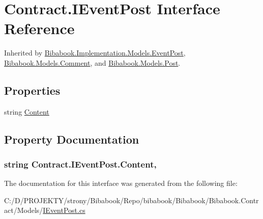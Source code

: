 \hypertarget{interface_contract_1_1_i_event_post}{}\section{Contract.\+I\+Event\+Post Interface Reference}
\label{interface_contract_1_1_i_event_post}


Inherited by \hyperlink{class_bibabook_1_1_implementation_1_1_models_1_1_event_post}{Bibabook.\+Implementation.\+Models.\+Event\+Post}, \hyperlink{class_bibabook_1_1_models_1_1_comment}{Bibabook.\+Models.\+Comment}, and \hyperlink{class_bibabook_1_1_models_1_1_post}{Bibabook.\+Models.\+Post}.

\subsection*{Properties}
\begin{DoxyCompactItemize}
\item 
string \hyperlink{interface_contract_1_1_i_event_post_a6ccae8749a3456fb835972d81ea7e3ed}{Content}
\end{DoxyCompactItemize}


\subsection{Property Documentation}
\hypertarget{interface_contract_1_1_i_event_post_a6ccae8749a3456fb835972d81ea7e3ed}{}
\subsubsection[{Content}]{\setlength{\rightskip}{0pt plus 5cm}string Contract.\+I\+Event\+Post.\+Content\hspace{0.3cm}{\ttfamily [get]}, {\ttfamily [set]}}\label{interface_contract_1_1_i_event_post_a6ccae8749a3456fb835972d81ea7e3ed}


The documentation for this interface was generated from the following file\+:\begin{DoxyCompactItemize}
\item 
C\+:/\+D/\+P\+R\+O\+J\+E\+K\+T\+Y/strony/\+Bibabook/\+Repo/bibabook/\+Bibabook/\+Bibabook.\+Contract/\+Models/\hyperlink{_i_event_post_8cs}{I\+Event\+Post.\+cs}\end{DoxyCompactItemize}
